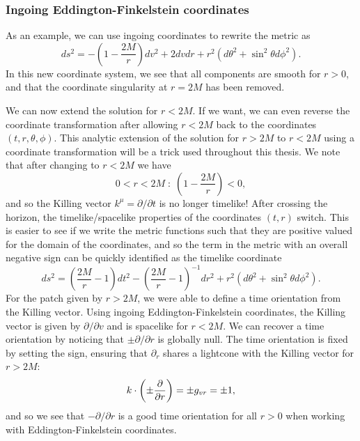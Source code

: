 \subsubsection{Ingoing Eddington-Finkelstein coordinates}

As an example, we can use ingoing coordinates to rewrite the metric as
\begin{equation*}
	ds^2 = - \left( 1 - \frac{2M}{r} \right) dv^2 + 2 dv dr + r^2 \left( d\theta^2 + \sin^2\theta d\phi^2 \right) .
\end{equation*}
In this new coordinate system, we see that all components are smooth for $r > 0$, and that the coordinate singularity at $r = 2M$ has been removed. 

We can now extend the \sch solution for $r < 2M$. If we want, we can even reverse the coordinate transformation after allowing $r < 2M$ back to the coordinates $(t,r,\theta,\phi)$. This analytic extension of the \sch solution for $r > 2M$ to $r < 2M$ using a coordinate transformation will be a trick used throughout this thesis. We note that after changing to $r < 2M$ we have
	\begin{equation*}
		 0 < r < 2M \; : \; \left( 1 - \frac{2M}{r} \right) < 0,
	\end{equation*} 
	and so the Killing vector $k^\mu = \partial / \partial t$ is no longer timelike! After crossing the horizon, the timelike/spacelike properties of the coordinates $(t,r)$ switch. This is easier to see if we write the metric functions such that they are positive valued for the domain of the coordinates, and so the term in the metric with an overall negative sign can be quickly identified as the timelike coordinate
	\begin{equation*}
		ds^2 = \left(\frac{2M}{r} - 1 \right) dt^2 - \left(\frac{2M}{r} - 1 \right)^{-1} dr^2 + r^2 \left( d\theta^2 + \sin^2\theta d\phi^2 \right) .
	\end{equation*}
	For the patch given by $r  >2M$, we were able to define a time orientation from the Killing vector. Using ingoing Eddington-Finkelstein coordinates, the Killing vector is given by $\partial / \partial v$ and is spacelike for $r < 2M$. We can recover a time orientation by noticing that $\pm \partial / \partial r$ is globally null. The time orientation is fixed by setting the sign, ensuring that $\partial_r$ shares a lightcone with the Killing vector for $r > 2M$:
	\begin{equation*}
		k \cdot \left(\pm \frac{\partial }{\partial r}\right) = \pm g_{vr} = \pm 1,
	\end{equation*}
	and so we see that $- \partial / \partial r$ is a good time orientation for all $r > 0$ when working with Eddington-Finkelstein coordinates.
	
